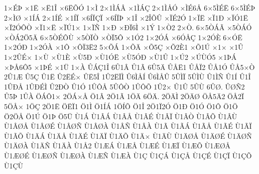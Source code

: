 {1^^d7^^c9^^de
^^d71^^cb
^^d7^^cb1^^ce
^^d76^^cb^^d5^^d3
1^^d7^^cc
2^^d71^^cc^^c1^^c2
^^d71^^cc^^c1^^c7
2^^d71^^cc^^c5^^d3
^^d7^^cc^^c96^^c5
6^^d75^^cc^^c9^^cb
6^^d75^^cc^^c9^^de
2^^d7^^cc^^d8
^^d71^^cd^^c1
2^^d71^^cd^^c9
^^d71^^cd^^cf
^^d76^^cd^^cf^^c7^^cf
^^d76^^cd^^cf^^de
^^d71^^ce
^^d72^^ce^^d5^^db
^^d7^^cf^^c92^^d3
1^^d7^^cf^^cb
^^d7^^cf1^^d0
^^d7^^cf^^d31^^cb
^^d7^^cf2^^d3^^d4^^d2
^^d7^^cf1^^d7^^cb
^^d7^^cf^^da1^^d7
1^^d7^^cf^^d1
1^^d7^^d0
^^d7^^d0^^cf6^^cc
^^d71^^dd
1^^d7^^d22
2^^d7^^d2.
6^^d75^^d2^^c1^^c3
^^d75^^d2^^c1^^d3
^^d7^^d2^^c12^^d65^^c4
6^^d75^^d2^^c9^^d4^^d9
^^d75^^d2^^cf^^d2
^^d7^^d2^^cf5^^d4
^^d71^^d32
1^^d72^^d3^^c1
^^d76^^d3^^c5^^c7
1^^d72^^d3^^c8
6^^d7^^d3^^cb
1^^d72^^d3^^d0
1^^d72^^d3^^c0
^^d71^^d4
^^d7^^d4^^cf3^^cb2
5^^d7^^d5^^c1
1^^d7^^d5^^c4
^^d7^^d55^^c7
^^d7^^d52^^c81
^^d7^^d51^^da
^^d71^^d7
^^d71^^db
1^^d72^^db^^c9^^d7
1^^d7^^d9
^^d7^^d91^^c8
^^d7^^d95^^d0
^^d7^^d91^^d3^^cb
^^d7^^d95^^d3^^d0
^^d7^^d91^^db
1^^d7^^da2
^^d7^^da^^d9^^d35
^^d71^^de^^c1
^^d7^^de^^c56^^d45
^^d71^^de^^c9
^^d71^^dc
1^^d7^^c0
^^db^^c1^^c71^^ce
6^^db1^^c2
^^db1^^c3
6^^db5^^c4
^^db^^c5^^cb1
^^db^^c5^^cf2
^^db^^c51^^d3
^^db^^c55^^d7^^d2
2^^db1^^c6
^^db5^^c7
^^db1^^cb
^^db2^^cb^^c9^^d7
^^db^^cb5^^ce
1^^db2^^cb^^cf^^cc
^^db6^^cc^^c5^^cd
^^db6^^cc^^c5^^db
5^^db^^cc^^cf
5^^db^^cc^^d9
^^db1^^cc^^d1
^^db1^^cd
^^db1^^ce
1^^db^^d0^^c5
1^^db^^d0^^c9^^cc
^^db2^^d0^^d2
^^db1^^d3
1^^db^^d4^^c5
5^^db^^d4^^d2
1^^db^^d4^^d5
1^^db2^^d7
^^db1^^db
5^^db^^d9
6^^db^^d8.
^^db^^d8^^d12
^^db5^^de
1^^db^^c0
^^d6^^c1^^d41^^d7
2^^d6^^c1^^d7^^c5
^^d61^^c2
2^^d61^^c3
1^^d6^^c4
6^^d6^^c4.
2^^d6^^c4^^cc
2^^d6^^c4^^d8
^^d6^^c55^^c42
^^d6^^c52^^cf
5^^d6^^c5^^d7
1^^d6^^c7
2^^d61^^cb
^^d6^^cb^^cf1
^^d61^^cc
^^d61^^cd^^c1
1^^d6^^cd^^d5
^^d61^^ce
2^^d61^^cf2^^d3
^^d61^^d0
^^d61^^d3
^^d61^^d4
^^d61^^d6
^^d62^^d6^^c5
^^d61^^da
^^d61^^de
^^d65^^dc
^^d91^^c1
^^d91^^c2^^c1
^^d91^^c2^^c5
^^d91^^c2^^c9
^^d91^^c2^^cf
^^d91^^c2^^d2
^^d91^^c2^^d5
^^d91^^c2^^d9
^^d91^^c2^^d8^^c5
^^d91^^c2^^d8^^c9
^^d91^^c2^^d8^^d1
^^d91^^c2^^d8^^c0
^^d91^^c2^^d1
^^d91^^c2^^c0
^^d91^^c3
^^d91^^c3^^c1
^^d91^^c3^^c5
^^d91^^c3^^c9
^^d91^^c3^^cf
^^d91^^c3^^d5
^^d91^^c4^^c1
^^d91^^c4^^c5
^^d91^^c4^^c9
^^d91^^c4^^cf
^^d91^^c4^^d5
^^d91^^c4^^d7
^^d91^^c4^^d9
^^d91^^c4^^d8^^c5
^^d91^^c4^^d8^^c9
^^d91^^c4^^d8^^d1
^^d91^^c4^^d8^^c0
^^d91^^c4^^d1
^^d91^^c4^^c0
^^d91^^c52
^^d91^^c6^^c1
^^d91^^c6^^c5
^^d91^^c6^^c9
^^d91^^c6^^cf
^^d91^^c6^^d5
^^d91^^c6^^d8^^c5
^^d91^^c6^^d8^^c9
^^d91^^c6^^d8^^d1
^^d91^^c6^^d8^^c0
^^d91^^c6^^d1
^^d91^^c6^^c0
^^d91^^c7
^^d91^^c7^^c1
^^d91^^c7^^c5
^^d91^^c7^^c9
^^d91^^c7^^cf
^^d91^^c7^^d5
^^d91^^c7^^d9
}
